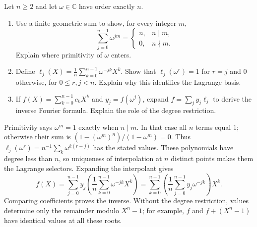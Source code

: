 Let $n\ge2$ and let $\omega\in\mathbb C$ have order exactly $n$.
\begin{enumerate}
 \item Use a finite geometric sum to show, for every integer $m$,
 \[
 \sum_{j=0}^{n-1}\omega^{jm}=
 \begin{cases}n,&n\mid m,\\0,&n\nmid m.\end{cases}
 \]
 Explain where primitivity of $\omega$ enters. 
 \item Define $\ell_j(X)=\frac1n\sum_{k=0}^{n-1}\omega^{-jk}X^k$.
 Show that $\ell_j(\omega^r)=1$ for $r=j$ and $0$ otherwise,
 for $0\le r,j<n$. Explain why this identifies the Lagrange basis.
 \item If $f(X)=\sum_{k=0}^{n-1}c_kX^k$ and $y_j=f(\omega^j)$,
 expand $f=\sum_j y_j\ell_j$ to derive the inverse Fourier formula.
 Explain the role of the degree restriction. 
\end{enumerate}
\begin{solution}
Primitivity says $\omega^m=1$ exactly when $n\mid m$. In that case all
$n$ terms equal $1$; otherwise their sum is
$(1-(\omega^m)^n)/(1-\omega^m)=0$.
Thus $\ell_j(\omega^r)=n^{-1}\sum_k\omega^{k(r-j)}$ has the stated values.
These polynomials have degree less than $n$, so uniqueness of interpolation
at $n$ distinct points makes them the Lagrange selectors.
Expanding the interpolant gives
\[
 f(X)=\sum_{j=0}^{n-1}y_j\left(\frac1n\sum_{k=0}^{n-1}\omega^{-jk}X^k\right)
 =\sum_{k=0}^{n-1}\left(\frac1n\sum_{j=0}^{n-1}y_j\omega^{-jk}\right)X^k.
\]
Comparing coefficients proves the inverse. Without the degree restriction,
values determine only the remainder modulo $X^n-1$; for example,
$f$ and $f+(X^n-1)$ have identical values at all these roots.
\end{solution}

